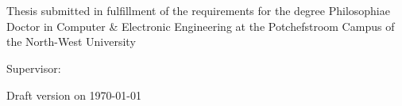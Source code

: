 
\begin{titlepage}
	\BgThispage
    \begin{center}
        \vspace*{1cm}
        
        \Huge
        \textbf{\ThesisTitle}
                
        \vspace{2cm}
        
        \Large
        \textbf{\Author}\\
        \textbf{\StudentNumber}\\
        \vspace{2cm}
        
           
        \large
       	Thesis submitted in fulfillment of the requirements for the degree
       	Philosophiae Doctor in Computer \& Electronic Engineering at the 
       	Potchefstroom Campus of the North-West University        
    \end{center}
    
    \normalsize          
    \vfill   
    \hspace{1.5cm}
	Supervisor: \Supervisor

	\vspace{2cm}
    \hspace{1.5cm}
	\FinalDate

	\footnotesize
    \hspace{1.5cm}
	Draft version on \today
	\vspace{3cm}
        
\end{titlepage}